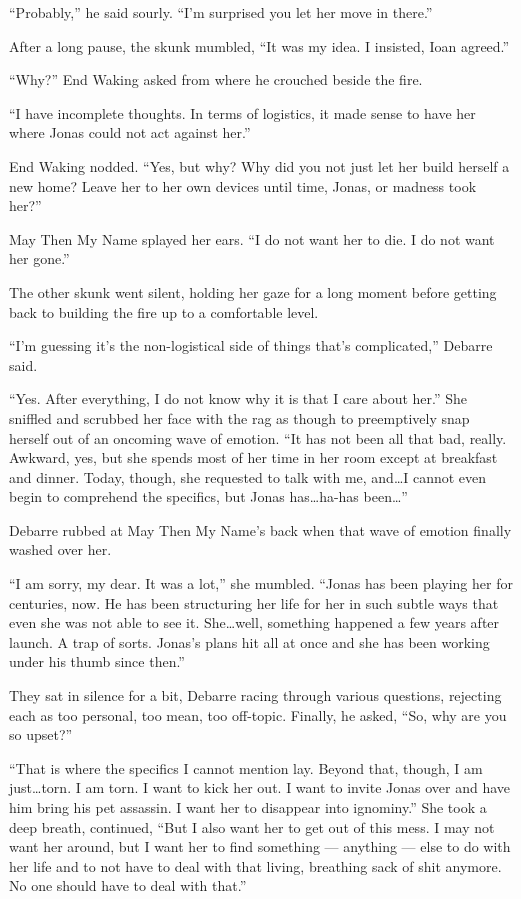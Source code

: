 ``Probably,'' he said sourly. ``I'm surprised you let her move in there.''

After a long pause, the skunk mumbled, ``It was my idea. I insisted, Ioan agreed.''

``Why?'' End Waking asked from where he crouched beside the fire.

``I have incomplete thoughts. In terms of logistics, it made sense to have her where Jonas could not act against her.''

End Waking nodded. ``Yes, but why? Why did you not just let her build herself a new home? Leave her to her own devices until time, Jonas, or madness took her?''

May Then My Name splayed her ears. ``I do not want her to die. I do not want her gone.''

The other skunk went silent, holding her gaze for a long moment before getting back to building the fire up to a comfortable level.

``I'm guessing it's the non-logistical side of things that's complicated,'' Debarre said.

``Yes. After everything, I do not know why it is that I care about her.'' She sniffled and scrubbed her face with the rag as though to preemptively snap herself out of an oncoming wave of emotion. ``It has not been all that bad, really. Awkward, yes, but she spends most of her time in her room except at breakfast and dinner. Today, though, she requested to talk with me, and\ldots I cannot even begin to comprehend the specifics, but Jonas has\ldots ha-has been\ldots{}''

Debarre rubbed at May Then My Name's back when that wave of emotion finally washed over her.

``I am sorry, my dear. It was a lot,'' she mumbled. ``Jonas has been playing her for centuries, now. He has been structuring her life for her in such subtle ways that even she was not able to see it. She\ldots well, something happened a few years after launch. A trap of sorts. Jonas's plans hit all at once and she has been working under his thumb since then.''

They sat in silence for a bit, Debarre racing through various questions, rejecting each as too personal, too mean, too off-topic. Finally, he asked, ``So, why are you so upset?''

``That is where the specifics I cannot mention lay. Beyond that, though, I am just\ldots torn. I am torn. I want to kick her out. I want to invite Jonas over and have him bring his pet assassin. I want her to disappear into ignominy.'' She took a deep breath, continued, ``But I also want her to get out of this mess. I may not want her around, but I want her to find something — anything — else to do with her life and to not have to deal with that living, breathing sack of shit anymore. No one should have to deal with that.''

